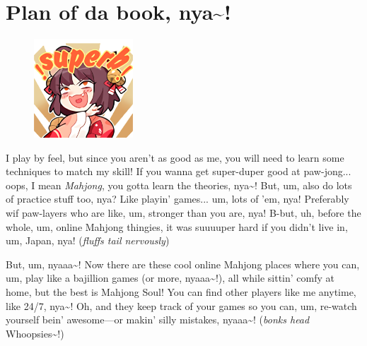 %
%
%

\section*{Plan of da book, nya\textasciitilde!}

\begin{figure}
    \centering
    \includegraphics[width=0.33\textwidth]{images/ichisuperb}
\end{figure}

I play by feel, but since you aren’t as good as me, you will need to learn
some techniques to match my skill! If you wanna get super-duper good at
paw-jong... oops, I mean \textit{Mahjong}, you gotta learn the theories, nya\textasciitilde!
But, um, also do lots of practice stuff too, nya? Like playin' games... um,
lots of 'em, nya! Preferably wif paw-layers who are like, um, stronger than you
are, nya! B-but, uh, before the whole, um, online Mahjong thingies, it was
suuuuper hard if you didn’t live in, um, Japan, nya! (\textit{fluffs tail nervously})

But, um, nyaaa\textasciitilde! Now there are these cool online Mahjong places where you
can, um, play like a bajillion games (or more, nyaaa\textasciitilde!), all while sittin'
comfy at home, but the best is Mahjong Soul! You can find other players like me
anytime, like 24/7, nya\textasciitilde! Oh, and they keep track of your games so you can, um,
re-watch yourself bein' awesome—or makin’ silly mistakes, nyaaa\textasciitilde! (\textit{bonks
head} Whoopsies\textasciitilde!)

